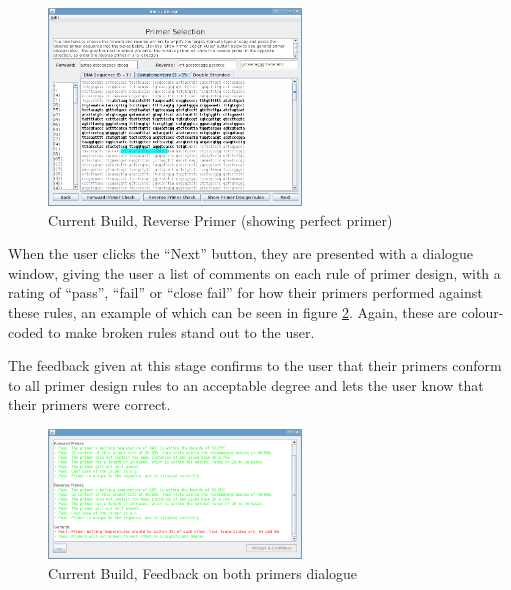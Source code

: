 \begin{figure}[!t]
  \begin{center}
    \includegraphics[width=0.6\textwidth]{./images/currentBuild/reversePrimerPerfect.png}
    \caption{
      \label{fig:currentBuild:reversePrimerPerfect}
      Current Build, Reverse Primer (showing perfect primer)
    }
  \end{center}
\end{figure}

When the user clicks the ``Next'' button, they are presented with a
dialogue window, giving the user a list of comments on each rule of
primer design, with a rating of ``pass'', ``fail'' or ``close fail''
for how their primers performed against these rules, an example of
which can be seen in figure
\ref{fig:currentBuild:primerDesignBothFeedback}.
Again, these are colour-coded to make broken rules stand out to the
user.

The feedback given at this stage confirms to the user that their
primers conform to all primer design rules to an acceptable degree and
lets the user know that their primers were correct.

\begin{figure}[!t]
  \begin{center}
    \includegraphics[width=0.6\textwidth]{./images/currentBuild/primerDesignBothFeedback.png}
    \caption{
      \label{fig:currentBuild:primerDesignBothFeedback}
      Current Build, Feedback on both primers dialogue
    }
  \end{center}
\end{figure}

